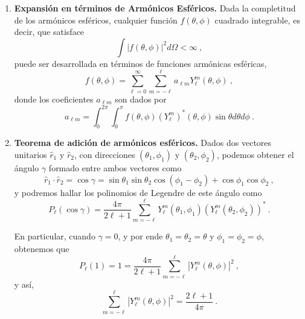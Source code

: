 \begin{enumerate}
    \item \textbf{Expansión en términos de Armónicos Esféricos.} Dada la completitud de los armónicos esféricos, cualquier función $f(\theta, \phi)$ cuadrado integrable, es decir, que satisface
    \begin{equation}
        \int | f(\theta, \phi) |^2 d\Omega < \infty \ ,
    \end{equation}
    puede ser desarrollada en términos de funciones armónicas esféricas,
    \begin{equation}
        f(\theta, \phi) = \sum_{\ell = 0}^{\infty} \sum_{m = -\ell}^{\ell} a_{\ell m} Y_\ell^m (\theta, \phi) \ ,
    \end{equation}
    donde los coeficientes $a_{\ell m}$ son dados por
    \begin{equation}
        a_{\ell m} = \int_{0}^{2\pi} \int_{0}^{\pi} f(\theta, \phi) (Y_\ell^m)^\ast (\theta, \phi) \sin\theta d\theta d\phi \ .
    \end{equation}

    \item \textbf{Teorema de adición de armónicos esféricos.} Dados dos vectores unitarios $\hat{r}_1$ y $\hat{r}_2$, con direcciones $(\theta_1, \phi_1)$ y $(\theta_2, \phi_2)$, podemos obtener el ángulo $\gamma$ formado entre ambos vectores como
    \begin{equation}
        \hat{r}_1 \cdot \hat{r}_2 = \cos\gamma = \sin\theta_1 \sin\theta_2 \cos(\phi_1 - \phi_2) + \cos\phi_1 \cos\phi_2 \ ,
    \end{equation}
    y podremos hallar los polinomios de Legendre de este ángulo como
    \begin{equation}
        P_\ell(\cos\gamma) = \frac{4\pi}{2\ell + 1} \sum_{m = -\ell}^\ell Y_\ell^m(\theta_1, \phi_1) (Y_\ell^m(\theta_2, \phi_2))^\ast \ .
    \end{equation}

    En particular, cuando $\gamma=0$, y por ende $\theta_1 = \theta_2 = \theta$ y $\phi_1 = \phi_2 = \phi$, obtenemos que
    \begin{equation}
        P_\ell(1) = 1 = \frac{4\pi}{2\ell + 1} \sum_{m = -\ell}^\ell |Y_\ell^m(\theta, \phi)|^2 \ ,
    \end{equation}
    y así,
    \begin{equation}
        \sum_{m = -\ell}^\ell |Y_\ell^m(\theta, \phi)|^2 = \frac{2\ell + 1}{4\pi} \ .
    \end{equation}

\end{enumerate}